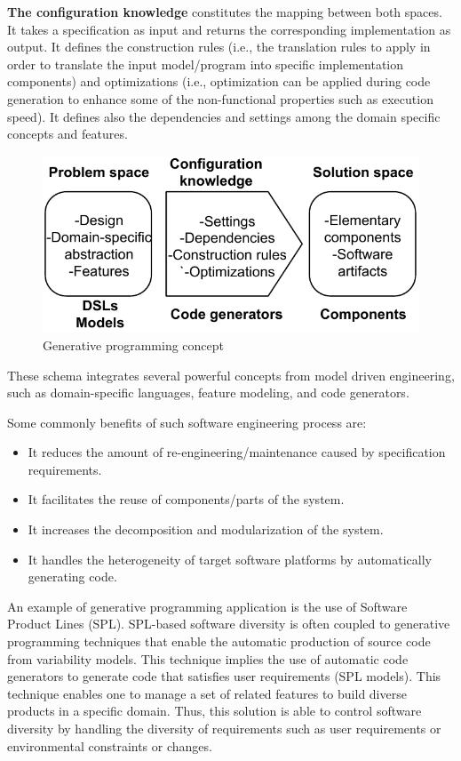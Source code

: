 \textbf{The configuration knowledge} constitutes the mapping between both spaces. It takes a specification as input and returns the corresponding implementation as output. It defines the construction rules (i.e., the translation rules to apply in order to translate the input model/program into specific implementation components) and optimizations (i.e., optimization can be applied during code generation to enhance some of the non-functional properties such as execution speed). It defines also the dependencies and settings among the domain specific concepts and features.

\begin{figure}[h]
	\center
	\includegraphics[scale=0.65]{Background/fig/GDM.pdf}
	\caption{Generative programming concept}
	\label{fig:GDM}
\end{figure}
These schema integrates several powerful concepts from model driven engineering, such as domain-specific languages, feature modeling, and code generators.

Some commonly benefits of such software engineering process are:
\begin{itemize}
\item It reduces the amount of re-engineering/maintenance caused by specification requirements.
\item It facilitates the reuse of components/parts of the system.
\item It increases the decomposition and modularization of the system.
\item It handles the heterogeneity of target software platforms by automatically generating code.
\end{itemize}

An example of generative programming application is the use of Software Product Lines (SPL)\cite{schaefer2012software}.
SPL-based software diversity is often coupled to generative programming techniques\cite{Czarnecki:2000:GPM:345203} that enable the automatic production of source code from variability models. This technique implies the use of automatic code generators to generate code that satisfies user requirements (SPL models).
This technique enables one to manage a set of related features to build diverse products in a specific domain. Thus, this solution is able to control software diversity by handling the diversity of requirements such as user requirements or environmental constraints or changes. 

